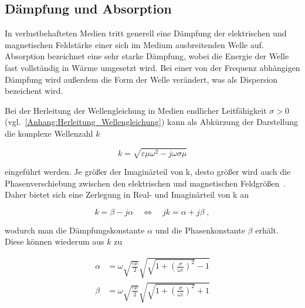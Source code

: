 \subsection{Dämpfung und Absorption}\label{cha:2_sub_Daempfung_und_Absorption}
In verlustbehafteten Medien tritt generell eine Dämpfung der elektrischen und magnetischen Feldstärke einer sich im Medium ausbreitenden Welle auf. Absorption bezeichnet eine sehr starke Dämpfung, wobei die Energie der Welle fast vollständig in Wärme umgesetzt wird. Bei einer von der Frequenz abhängigen Dämpfung wird außerdem die Form der Welle verändert, was als Dispersion bezeichent wird. 
\par
\vspace{\linespace}
Bei der Herleitung der Wellengleichung in Medien endlicher Leitfähigkeit $\sigma > 0$ (vgl.~\Anhang \ref{Anhang:Herleitung_Wellengleichung}) kann als Abkürzung der Darstellung die komplexe Wellenzahl $k$

\begin{equation}
    k = \sqrt{\varepsilon \mu \omega^2 - j \omega \sigma \mu}
\end{equation}

eingeführt werden. Je größer der Imaginärteil von k, desto größer wird auch die Phasenverschiebung zwischen den elektrischen und magnetischen Feldgrößen~\cite{EM_Schirmung}. Daher bietet sich eine Zerlegung in Real- und Imaginärteil von k an

\begin{equation}
    k = \beta - j \alpha \quad \Leftrightarrow \quad jk = \alpha + j\beta \; ,
\end{equation}

wodurch man die Dämpfungskonstante $\alpha$ und die Phasenkonstante $\beta$ erhält. Diese können wiederum aus $k$ zu

\begin{align}
    \alpha &= \omega \sqrt{\frac{\varepsilon \mu}{2}} \sqrt{\sqrt{1+\left(\frac{\sigma}{\omega\varepsilon}\right)^2}-1} \\
    \beta &= \omega \sqrt{\frac{\varepsilon \mu}{2}} \sqrt{\sqrt{1+\left(\frac{\sigma}{\omega\varepsilon}\right)^2}+1}
\end{align}

